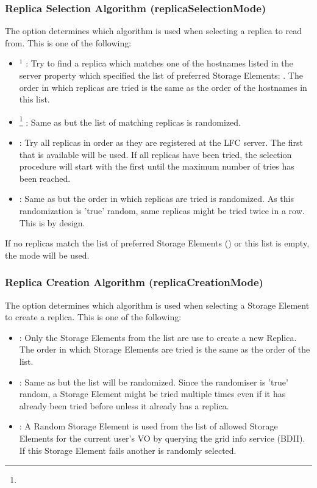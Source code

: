 \subsubsection{Replica Selection Algorithm (replicaSelectionMode) } 

The option  determines which algorithm is used when
selecting a replica to read from. This is one of the following: 

\begin{itemize}
  \item {}$^1$ :  Try to find a replica which matches one of the
  hostnames listed in the server property which specified the list of preferred
  Storage Elements: . 
  The order in which replicas are tried is the same as the order of the
  hostnames in this list. 
  \item {}\footnote{} : Same as  but the list of
  matching replicas is randomized. 
  \item {} : Try all replicas in order as they are registered
  at the LFC server. The first that is available will be used. If all replicas
  have been tried, the selection procedure will start with the first until the
  maximum number of tries has been reached. 
  \item {} : Same as  but the order in which
  replicas are tried is randomized. As this randomization is 'true' random,
  same replicas might be tried twice in a row. This is by design. 
\end{itemize} 

 If no replicas match the list of preferred Storage Elements
() or this list is empty, the mode 
will be used.

\subsubsection{Replica Creation Algorithm (replicaCreationMode) }

The option  determines which algorithm is used when
selecting a Storage Element to create a replica. 
This is one of the following:

\begin{itemize}
  \item {} :  Only the Storage Elements from the 
       list are use to create a new Replica. The order in
      which Storage Elements are tried is the same as the order of the list. 
  \item {} : Same as  but the list will be
      randomized. Since the randomiser is 'true' random, a Storage Element
      might be tried multiple times even if it has already been tried before
      unless it already has a replica. 
  \item {} : A Random Storage Element is used from the list
  of allowed Storage Elements for the current user's VO by querying the grid info
  service (BDII). If this Storage Element fails another is randomly selected.   
\end{itemize} 
 
